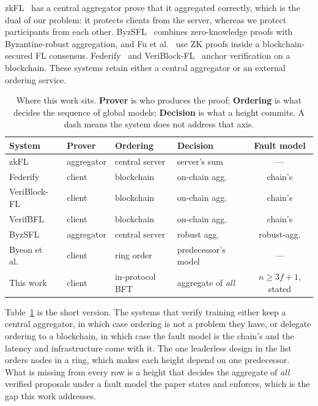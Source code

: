 \documentclass{llncs}
\begin{document}
zkFL~\cite{wang2024zkfl} has a central aggregator prove that it aggregated
correctly, which is the dual of our problem: it protects clients from the
server, whereas we protect participants from each other. ByzSFL~\cite{fan2025byzsfl}
combines zero-knowledge proofs with Byzantine-robust aggregation, and
Fu et al.~\cite{fu2025zkpconsensus} use ZK proofs inside a blockchain-secured FL
consensus. Federify~\cite{keshavarzkalhori2023federify} and
VeriBlock-FL~\cite{raghavarapu_veriblockfl} anchor verification on a blockchain.
These systems retain either a central aggregator or an external ordering
service.

\begin{table}[t]
\centering
\caption{Where this work sits. \textbf{Prover} is who produces the proof;
\textbf{Ordering} is what decides the sequence of global models;
\textbf{Decision} is what a height commits. A dash means the system does not
address that axis.}
\label{tab:related}
\begin{tabular}{llllc}
\toprule
\textbf{System} & \textbf{Prover} & \textbf{Ordering} & \textbf{Decision} &
\textbf{Fault model} \\
\midrule
zkFL~\cite{wang2024zkfl}        & aggregator & central server & server's sum & --- \\
Federify~\cite{keshavarzkalhori2023federify} & client & blockchain & on-chain agg. & chain's \\
VeriBlock-FL~\cite{raghavarapu_veriblockfl} & client & blockchain & on-chain agg. & chain's \\
VerifBFL~\cite{bellachia2025verifbfl} & client & blockchain & on-chain agg. & chain's \\
ByzSFL~\cite{fan2025byzsfl}     & aggregator & central server & robust agg. & robust-agg. \\
Byeon et al.~\cite{byeon2025trusted} & client & ring order & predecessor's model & --- \\
\midrule
This work & client & in-protocol BFT & aggregate of \emph{all} &
$n \ge 3f{+}1$, stated \\
\bottomrule
\end{tabular}
\end{table}

Table~\ref{tab:related} is the short version. The systems that verify training
either keep a central aggregator, in which case ordering is not a problem they
have, or delegate ordering to a blockchain, in which case the fault model is the
chain's and the latency and infrastructure come with it. The one leaderless
design in the list orders nodes in a ring, which makes each height depend on one
predecessor. What is missing from every row is a height that decides the
aggregate of \emph{all} verified proposals under a fault model the paper states
and enforces, which is the gap this work addresses.
\end{document}
